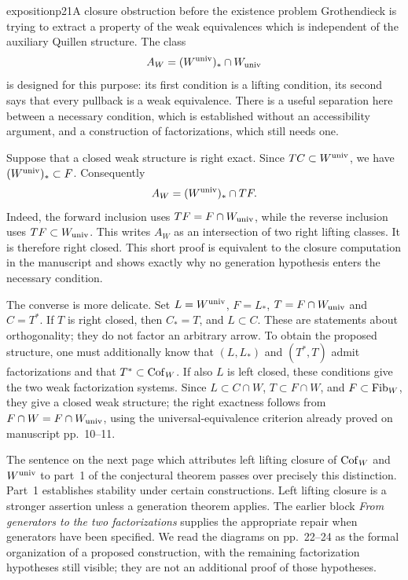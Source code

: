 \begin{dcomment}{exposition}{p21}{A closure obstruction before the existence problem}
Grothendieck is trying to extract a property of the weak equivalences which is independent of the auxiliary Quillen structure. The class
\[
 A_W=(W^{\mathrm{univ}})_*\cap W_{\mathrm{univ}}
\]
is designed for this purpose: its first condition is a lifting condition, its second says that every pullback is a weak equivalence. There is a useful separation here between a necessary condition, which is established without an accessibility argument, and a construction of factorizations, which still needs one.

Suppose that a closed weak structure is right exact. Since $TC\subset W^{\mathrm{univ}}$, we have $(W^{\mathrm{univ}})_*\subset F$. Consequently
\[
 A_W= (W^{\mathrm{univ}})_*\cap TF.
\]
Indeed, the forward inclusion uses $TF=F\cap W_{\mathrm{univ}}$, while the reverse inclusion uses $TF\subset W_{\mathrm{univ}}$. This writes $A_W$ as an intersection of two right lifting classes. It is therefore right closed. This short proof is equivalent to the closure computation in the manuscript and shows exactly why no generation hypothesis enters the necessary condition.

The converse is more delicate. Set $L=W^{\mathrm{univ}}$, $F=L_*$, $T=F\cap W_{\mathrm{univ}}$ and $C=T^*$. If $T$ is right closed, then $C_*=T$, and $L\subset C$. These are statements about orthogonality; they do not factor an arbitrary arrow. To obtain the proposed structure, one must additionally know that $(L,L_*)$ and $(T^*,T)$ admit factorizations and that $T^*\subset\mathrm{Cof}_W$. If also $L$ is left closed, these conditions give the two weak factorization systems. Since $L\subset C\cap W$, $T\subset F\cap W$, and $F\subset\mathrm{Fib}_W$, they give a closed weak structure; the right exactness follows from $F\cap W=F\cap W_{\mathrm{univ}}$, using the universal-equivalence criterion already proved on manuscript pp.~10--11.

The sentence on the next page which attributes left lifting closure of $\mathrm{Cof}_W$ and $W^{\mathrm{univ}}$ to part~1 of the conjectural theorem passes over precisely this distinction. Part~1 establishes stability under certain constructions. Left lifting closure is a stronger assertion unless a generation theorem applies. The earlier block \emph{From generators to the two factorizations} supplies the appropriate repair when generators have been specified. We read the diagrams on pp.~22--24 as the formal organization of a proposed construction, with the remaining factorization hypotheses still visible; they are not an additional proof of those hypotheses.
\end{dcomment}


